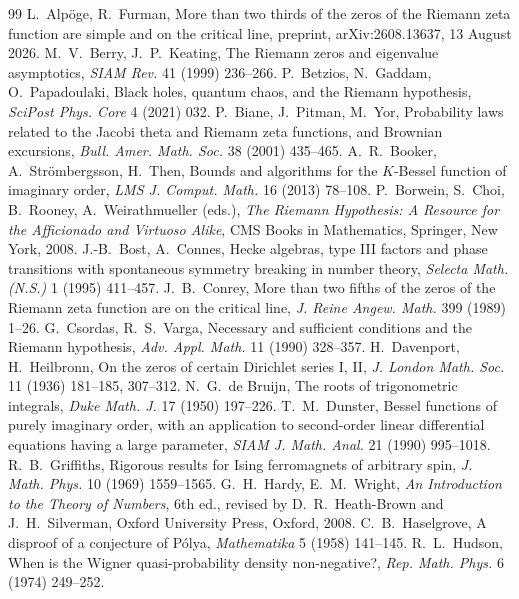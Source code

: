 \documentclass[11pt]{article}
\theoremstyle{definition}\newtheorem{definition}[theorem]{Definition}
\theoremstyle{remark}\newtheorem{remark}[theorem]{Remark}
\begin{document}
\begin{thebibliography}{99}\small
{} L.~Alp\"oge, R.~Furman, More than two thirds of the zeros of the Riemann zeta function are simple and on the critical line, preprint, arXiv:2608.13637, 13 August 2026.
 M.~V.~Berry, J.~P.~Keating, The Riemann zeros and eigenvalue asymptotics, \emph{SIAM Rev.} 41 (1999) 236--266.
 P.~Betzios, N.~Gaddam, O.~Papadoulaki, Black holes, quantum chaos, and the Riemann hypothesis, \emph{SciPost Phys. Core} 4 (2021) 032.
 P.~Biane, J.~Pitman, M.~Yor, Probability laws related to the Jacobi theta and Riemann zeta functions, and Brownian excursions, \emph{Bull. Amer. Math. Soc.} 38 (2001) 435--465.
 A.~R.~Booker, A.~Str\"ombergsson, H.~Then, Bounds and algorithms for the $K$-Bessel function of imaginary order, \emph{LMS J. Comput. Math.} 16 (2013) 78--108.
 P.~Borwein, S.~Choi, B.~Rooney, A.~Weirathmueller (eds.), \emph{The Riemann Hypothesis: A Resource for the Afficionado and Virtuoso Alike}, CMS Books in Mathematics, Springer, New York, 2008.
 J.-B.~Bost, A.~Connes, Hecke algebras, type III factors and phase transitions with spontaneous symmetry breaking in number theory, \emph{Selecta Math. (N.S.)} 1 (1995) 411--457.
 J.~B.~Conrey, More than two fifths of the zeros of the Riemann zeta function are on the critical line, \emph{J. Reine Angew. Math.} 399 (1989) 1--26.
 G.~Csordas, R.~S.~Varga, Necessary and sufficient conditions and the Riemann hypothesis, \emph{Adv. Appl. Math.} 11 (1990) 328--357.
 H.~Davenport, H.~Heilbronn, On the zeros of certain Dirichlet series I, II, \emph{J. London Math. Soc.} 11 (1936) 181--185, 307--312.
 N.~G.~de Bruijn, The roots of trigonometric integrals, \emph{Duke Math. J.} 17 (1950) 197--226.
 T.~M.~Dunster, Bessel functions of purely imaginary order, with an application to second-order linear differential equations having a large parameter, \emph{SIAM J. Math. Anal.} 21 (1990) 995--1018.
 R.~B.~Griffiths, Rigorous results for Ising ferromagnets of arbitrary spin, \emph{J. Math. Phys.} 10 (1969) 1559--1565.
 G.~H.~Hardy, E.~M.~Wright, \emph{An Introduction to the Theory of Numbers}, 6th ed., revised by D.~R.~Heath-Brown and J.~H.~Silverman, Oxford University Press, Oxford, 2008.
 C.~B.~Haselgrove, A disproof of a conjecture of P\'olya, \emph{Mathematika} 5 (1958) 141--145.
 R.~L.~Hudson, When is the Wigner quasi-probability density non-negative?, \emph{Rep. Math. Phys.} 6 (1974) 249--252.

\end{thebibliography}
\end{document}
